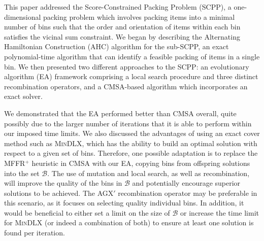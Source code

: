 \documentclass[a4paper,11pt,authoryear]{elsarticle}
\begin{document}
\noindent This paper addressed the Score-Constrained Packing Problem (SCPP), a one-dimensional packing problem which involves packing items into a minimal number of bins such that the order and orientation of items within each bin satisfies the vicinal sum constraint. We began by describing the Alternating Hamiltonian Construction (AHC) algorithm for the sub-SCPP, an exact polynomial-time algorithm that can identify a feasible packing of items in a single bin. We then presented two different approaches to the SCPP: an evolutionary algorithm (EA) framework comprising a local search procedure and three distinct recombination operators, and a CMSA-based algorithm which incorporates an exact solver.

We demonstrated that the EA performed better than CMSA overall, quite possibly due to the larger number of iterations that it is able to perform within our imposed time limits. We also discussed the advantages of using an exact cover method such as \textsc{MinDLX}, which has the ability to build an optimal solution with respect to a given set of bins. Therefore, one possible adaptation is to replace the MFFR$^+$ heuristic in CMSA with our EA, copying bins from offspring solutions into the set $\mathcal{B}$. The use of mutation and local search, as well as recombination, will improve the quality of the bins in $\mathcal{B}$ and potentially encourage superior solutions to be achieved. The AGX$'$ recombination operator may be preferable in this scenario, as it focuses on selecting quality individual bins. In addition, it would be beneficial to either set a limit on the size of $\mathcal{B}$ or increase the time limit for \textsc{MinDLX} (or indeed a combination of both) to ensure at least one solution is found per iteration.




\end{document}
